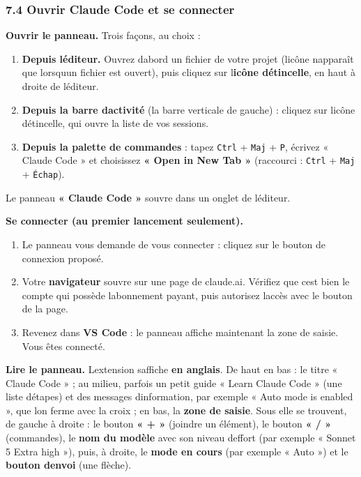 \documentclass[
  french,
  11pt,
  a4paper,
]{article}
\providecommand{\tightlist}{%
  \setlength{\itemsep}{0pt}\setlength{\parskip}{0pt}}
\begin{document}
\subsubsection{7.4 Ouvrir Claude Code et se
connecter}\label{74-ouvrir-claude-code-et-se-connecter}

\textbf{Ouvrir le panneau.} Trois façons, au choix :

\begin{enumerate}
\def\labelenumi{\arabic{enumi}.}
\tightlist
\item
  \textbf{Depuis l\textquotesingle éditeur.} Ouvrez
  d\textquotesingle abord un fichier de votre projet
  (l\textquotesingle icône n\textquotesingle apparaît que
  lorsqu\textquotesingle un fichier est ouvert), puis cliquez sur
  l\textquotesingle{}\textbf{icône d\textquotesingle étincelle}, en haut
  à droite de l\textquotesingle éditeur.
\item
  \textbf{Depuis la barre d\textquotesingle activité} (la barre
  verticale de gauche) : cliquez sur l\textquotesingle icône
  d\textquotesingle étincelle, qui ouvre la liste de vos sessions.
\item
  \textbf{Depuis la palette de commandes} : tapez \texttt{Ctrl} +
  \texttt{Maj} + \texttt{P}, écrivez « Claude Code » et choisissez
  \textbf{« Open in New Tab »} (raccourci : \texttt{Ctrl} + \texttt{Maj}
  + \texttt{Échap}).
\end{enumerate}

Le panneau \textbf{« Claude Code »} s\textquotesingle ouvre dans un
onglet de l\textquotesingle éditeur.

\textbf{Se connecter (au premier lancement seulement).}

\begin{enumerate}
\def\labelenumi{\arabic{enumi}.}
\tightlist
\item
  Le panneau vous demande de vous connecter : cliquez sur le bouton de
  connexion proposé.
\item
  Votre \textbf{navigateur} s\textquotesingle ouvre sur une page de
  claude.ai. Vérifiez que c\textquotesingle est bien le compte qui
  possède l\textquotesingle abonnement payant, puis autorisez
  l\textquotesingle accès avec le bouton de la page.
\item
  Revenez dans \textbf{VS Code} : le panneau affiche maintenant la zone
  de saisie. Vous êtes connecté.
\end{enumerate}

\textbf{Lire le panneau.} L\textquotesingle extension
s\textquotesingle affiche \textbf{en anglais}. De haut en bas : le titre
« Claude Code » ; au milieu, parfois un petit guide « Learn Claude Code
» (une liste d\textquotesingle étapes) et des messages
d\textquotesingle information, par exemple « Auto mode is enabled », que
l\textquotesingle on ferme avec la croix ; en bas, la \textbf{zone de
saisie}. Sous elle se trouvent, de gauche à droite : le bouton \textbf{«
+ »} (joindre un élément), le bouton \textbf{« / »} (commandes), le
\textbf{nom du modèle} avec son niveau d\textquotesingle effort (par
exemple « Sonnet 5 Extra high »), puis, à droite, le \textbf{mode en
cours} (par exemple « Auto ») et le \textbf{bouton
d\textquotesingle envoi} (une flèche).
\end{document}
